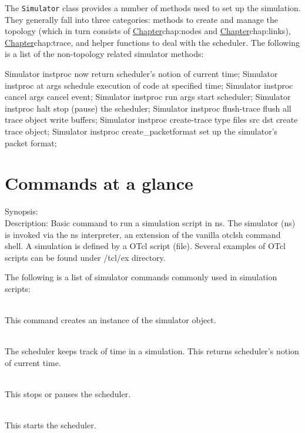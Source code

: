 The {\tt Simulator} class provides a number of methods used
to set up the simulation.
They generally fall into three categories:
methods to create and manage the topology 
(which in turn consists of
\href{managing the nodes}{Chapter}{chap:nodes} and
\href{managing the links}{Chapter}{chap:links}),
\href{methods to perform tracing}{Chapter}{chap:trace},
and helper functions to deal with the scheduler.
The following is a list of the non-topology related simulator methods:
\begin{program}
Simulator instproc now {} \; return scheduler's notion of current time;
Simulator instproc at args \; schedule execution of code at specified time;
Simulator instproc cancel args \; cancel event;
Simulator instproc run args \; start scheduler;
Simulator instproc halt {} \; stop (pause) the scheduler;
Simulator instproc flush-trace {} \; flush all trace object write buffers;
Simulator instproc create-trace { type files src dst } \; create trace object;
Simulator instproc create_packetformat \; set up the simulator's packet format;

\clearpage

\section{Commands at a glance}
\label{sec:simcommand}
\begin{flushleft}
Synopsis:
\\
Description:
Basic command to run a simulation script in ns.
The simulator (ns) is invoked  via the ns interpreter, an extension of the
vanilla otclsh command shell. A simulation is defined by a OTcl script
(file). Several examples of OTcl scripts can be found under \ns/tcl/ex
directory.


The following is a list of simulator commands commonly used in simulation
scripts:

\\
This command creates an instance of the simulator object.


\\
The scheduler keeps track of time in a simulation. This returns scheduler's
notion of current time.


\\
This stops or pauses the scheduler.


\\
This starts the scheduler.



\end{flushleft}
\end{program}

